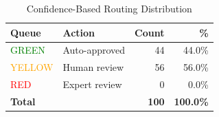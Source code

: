 \begin{table}[h]
\centering
\caption{Confidence-Based Routing Distribution}
\label{tab:routing}
\begin{tabular}{llrr}
\toprule
\textbf{Queue} & \textbf{Action} & \textbf{Count} & \textbf{\%} \\
\midrule
\textcolor{green}{GREEN} & Auto-approved & 44 & 44.0\% \\
\textcolor{orange}{YELLOW} & Human review & 56 & 56.0\% \\
\textcolor{red}{RED} & Expert review & 0 & 0.0\% \\
\midrule
\textbf{Total} & & \textbf{100} & \textbf{100.0\%} \\
\bottomrule
\end{tabular}
\end{table}
